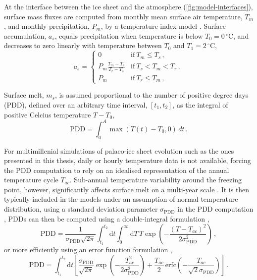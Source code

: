 \documentclass{article}
\newcommand{\PDD}[0]{\mathrm{PDD}}
\newcommand{\sPDD}[0]{\sigma_{\mathrm{PDD}}}
\newcommand{\unit}[1]{\ensuremath{\mathrm{#1}}}
\newcommand{\degree}[0]{\ensuremath{^{\circ}}}
\newcommand{\degC}[0]{\unit{{\degree}C}}
\begin{document}
At the interface between the ice sheet and the atmosphere
(\cref{fig:model-interfaces}),
surface mass fluxes are computed from monthly mean surface air temperature,
$T_m$, and monthly precipitation, $P_m$, by a temperature-index model
\citep[e.g.,][]{Hock.2003}. Surface accumulation, $a_s$, equals precipitation
when temperature is below ${T_0=0\,\degC}$, and decreases to zero linearly
with temperature between $T_0$ and ${T_1=2\,\degC}$,
\begin{equation}
    a_s =
    \begin{cases}
        0       & \text{if}\ T_m \le T_s \,, \\
        P_m \frac{T_m-T_s}{T_r-T_s}
                & \text{if}\ T_s < T_m < T_r \,, \\
        P_m     & \text{if}\ T_r \le T_m \,,
    \end{cases}
\end{equation}

Surface melt, $m_s$, is assumed proportional to the number of positive degree
days (PDD), defined over an arbitrary time interval, $[t_1, t_2]$, as the
integral of positive Celcius temperature $T-T_0$,
\begin{equation}
    \mathrm{PDD} = \int_{0}^{A}\max(T(t)-T_0,0)\,dt \,.
\end{equation}

For multimillenial simulations of palaeo-ice sheet evolution such as the ones
presented in this thesis, daily or hourly temperature data is not available,
forcing the PDD computation to rely on an idealised representation of the
annual temperature cycle $T_{ac}$. Sub-annual temperature variability around
the freezing point, however, significantly affects surface melt on a multi-year
scale \citep{Arnold.Mackay.1964}. It is then typically included in the models
under an assumption of normal temperature distribution, using a standard
deviation parameter $\sPDD$ in the PDD computation \citep{Braithwaite.1984},
PDDs can then be computed using a double-integral formulation
\citep{Reeh.1991},
\begin{equation}
    \PDD = \frac{1}{\sPDD\sqrt{2\pi}}
        \int_{t_1}^{t_2} \mathrm{d}t
        \int_{0}^{\infty} \mathrm{d}T \,
        T \exp\left({-\frac{(T-T_{ac})^2}{2\sPDD^2}}\right) \,,
\end{equation}
or more efficiently using an error function formulation
\citep{Calov.Greve.2005},
\begin{equation}
    \label{eqn:calovgreve}
    \PDD = \int_{t_1}^{t_2} \mathrm{d}t
        \left[\frac{\sPDD}{\sqrt{2\pi}}
                \exp\left({-\frac{T_{ac}^2}{2\sPDD^2}}\right)
              + \frac{T_{ac}}{2} \, \mathrm{erfc}
                \left(-\frac{T_{ac}}{\sqrt{2}\sPDD}\right)\right] \,.
\end{equation}
\end{document}
